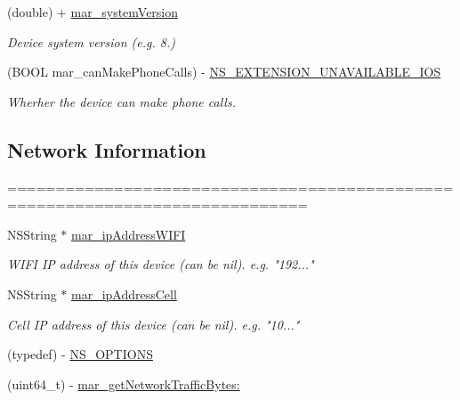 \begin{DoxyCompactItemize}
(double) + \hyperlink{category_u_i_device_07_m_a_r_e_x_08_ac110568f25bb7394f05acae4f6e4119b}{mar\+\_\+system\+Version}
\begin{DoxyCompactList}\small\item\em Device system version (e.\+g. 8.) \end{DoxyCompactList}\item 
(B\+O\+OL mar\+\_\+can\+Make\+Phone\+Calls) -\/ \hyperlink{category_u_i_device_07_m_a_r_e_x_08_a8e9f0f956d24a9a6d891b6d747d198e0}{N\+S\+\_\+\+E\+X\+T\+E\+N\+S\+I\+O\+N\+\_\+\+U\+N\+A\+V\+A\+I\+L\+A\+B\+L\+E\+\_\+\+I\+OS}
\begin{DoxyCompactList}\small\item\em Wherher the device can make phone calls. \end{DoxyCompactList}\end{DoxyCompactItemize}
\subsection*{Network Information}
\label{_amgrpb69b35bdc952773d320125ae9bd36d16}%
============================================================================= 

 \begin{DoxyCompactItemize}
\item 
N\+S\+String $\ast$ \hyperlink{category_u_i_device_07_m_a_r_e_x_08_aac775f9981938992e94c85a2c4da6533}{mar\+\_\+ip\+Address\+W\+I\+FI}
\begin{DoxyCompactList}\small\item\em W\+I\+FI IP address of this device (can be nil). e.\+g. "192..." \end{DoxyCompactList}\item 
N\+S\+String $\ast$ \hyperlink{category_u_i_device_07_m_a_r_e_x_08_a588a4cf3d1ec3aa3e0f42872104a75f9}{mar\+\_\+ip\+Address\+Cell}
\begin{DoxyCompactList}\small\item\em Cell IP address of this device (can be nil). e.\+g. "10..." \end{DoxyCompactList}\item 
(typedef) -\/ \hyperlink{category_u_i_device_07_m_a_r_e_x_08_aba32e9a68cbc8bdd5fa716b29b9de0eb}{N\+S\+\_\+\+O\+P\+T\+I\+O\+NS}
\item 
(uint64\+\_\+t) -\/ \hyperlink{category_u_i_device_07_m_a_r_e_x_08_ae8348fd2d2db118f68e907684094a2ce}{mar\+\_\+get\+Network\+Traffic\+Bytes\+:}
\end{DoxyCompactItemize}


